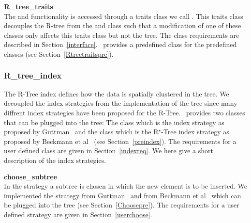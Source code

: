 \noindent
{\bf R\_tree\_traits}\\
\noindent
The 
and  functionality is
accessed through a traits class we call . This traits class decouples
the R-tree  from the 
and  class such that a modification of one of these classes
only affects this traits class but not the tree. 
The  class requirements are
described in  Section~\ref{interface}.
\cgal\ provides a predefined  class for the
predefined  classes (see Section~\ref{Rtreetraitspre}). 




\subsubsection{R\_tree\_index}
The R-Tree index defines how the data is spatially clustered in
the tree. We decoupled the index strategies from the
implementation of the tree since many diffrent index
strategies have been proposed for the R-Tree. \cgal\ provides two 
 classes that can be plugged into the tree: The
 class which is the index strategy as
proposed by Guttman~\cite{gutt-84} and the 
class which is the R$^\star$-Tree index strategy as proposed by  Beckmann
et al~\cite{Beckmann:1990:RER} (see Section~\ref{preindex}). The
requirements for a user defined  class are
given in Section~\ref{indexreq}.
We here give a
short description of the index strategies.
\medskip

\noindent
{\bf choose\_subtree}\\
\noindent
In the  strategy a subtree is chosen in which 
the new element is to be inserted. 
We implemented
the  strategy from Guttman~\cite{gutt-84}
and from Beckmann
et al~\cite{Beckmann:1990:RER} which can be plugged into the
tree (see Section~\ref{Choosepre}). The requirements for a user
defined  strategy are given in
Section~\ref{userchoose}.
\medskip

